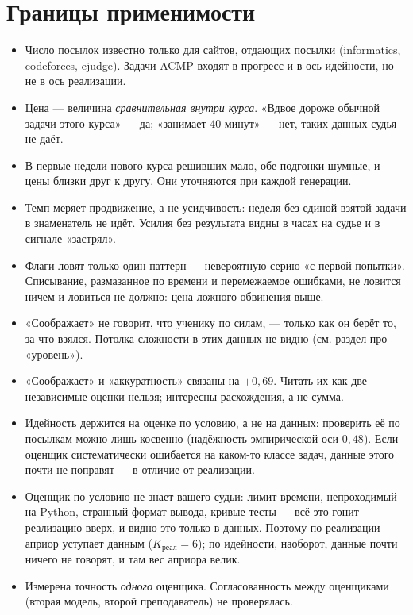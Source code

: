 \documentclass[11pt,a4paper]{article}
\begin{document}
\section{Границы применимости}

\begin{itemize}[itemsep=2pt]
  \item Число посылок известно только для сайтов, отдающих посылки
        (informatics, codeforces, ejudge). Задачи ACMP входят в прогресс и в
        ось идейности, но не в ось реализации.
  \item Цена --- величина \emph{сравнительная внутри курса}. «Вдвое дороже
        обычной задачи этого курса» --- да; «занимает 40 минут» --- нет, таких
        данных судья не даёт.
  \item В первые недели нового курса решивших мало, обе подгонки шумные, и
        цены близки друг к другу. Они уточняются при каждой генерации.
  \item Темп меряет продвижение, а не усидчивость: неделя без единой взятой
        задачи в знаменатель не идёт. Усилия без результата видны в часах на
        судье и в сигнале «застрял».
  \item Флаги ловят только один паттерн --- невероятную серию «с первой
        попытки». Списывание, размазанное по времени и перемежаемое ошибками,
        не ловится ничем и ловиться не должно: цена ложного обвинения выше.
  \item «Соображает» не говорит, что ученику по силам, --- только как он берёт
        то, за что взялся. Потолка сложности в этих данных не видно (см. раздел
        про «уровень»).
  \item «Соображает» и «аккуратность» связаны на $+0{,}69$. Читать их как две
        независимые оценки нельзя; интересны расхождения, а не сумма.
  \item Идейность держится на оценке по условию, а не на данных: проверить её
        по посылкам можно лишь косвенно (надёжность эмпирической оси $0{,}48$).
        Если оценщик систематически ошибается на каком-то классе задач, данные
        этого почти не поправят --- в отличие от реализации.
  \item Оценщик по условию не знает вашего судьи: лимит времени, непроходимый
        на Python, странный формат вывода, кривые тесты --- всё это гонит
        реализацию вверх, и видно это только в данных. Поэтому по реализации
        априор уступает данным ($K_{\text{реал}} = 6$); по идейности, наоборот,
        данные почти ничего не говорят, и там вес априора велик.
  \item Измерена точность \emph{одного} оценщика. Согласованность между
        оценщиками (вторая модель, второй преподаватель) не проверялась.
\end{itemize}
\end{document}
